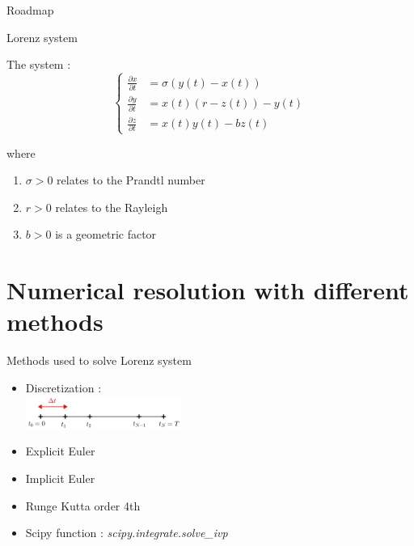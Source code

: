 \documentclass[10pt,xcolor={table,dvipsnames},t]{beamer}
\begin{document}
	\begin{frame}{Roadmap}
		
	\end{frame}
	
	
	\begin{frame}[allowframebreaks]{Lorenz system}
		
		The system :
		$$\left\{\begin{aligned} 
			\frac{\partial x}{\partial t} &=\sigma(y(t)-x(t))\\
			\frac{\partial y}{\partial t}&=x(t)(r-z(t))-y(t) \\
			\frac{\partial z}{\partial t}&=x(t)y(t)-bz(t)
		\end{aligned}\right.$$
	
		where
		
		\begin{enumerate}[\textbullet]
			\item $\sigma > 0$  relates to the Prandtl number
			\item $r > 0$  relates to the Rayleigh
			\item $b > 0$ is a geometric factor
		\end{enumerate}
		
	\end{frame}
	
	
	\section{Numerical resolution with different methods}
	
	\begin{frame}{Methods used to solve Lorenz system}
		
		\begin{itemize}
			\item Discretization : \\
			\qquad \includegraphics[width=0.4\textwidth]{images/discretization.jpg} \\
			\item Explicit Euler
			\item Implicit Euler			
			\item Runge Kutta order 4th			
			\item Scipy function : \qquad \textit{scipy.integrate.solve\_ivp}
		\end{itemize}
		
	\end{frame}
	
\end{document}
